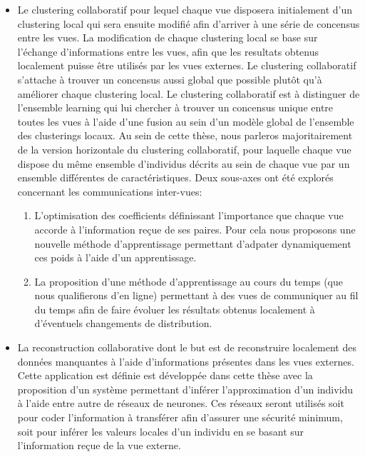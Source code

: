 \begin{itemize}
    \item Le clustering collaboratif pour lequel chaque vue disposera initialement d'un clustering local qui sera ensuite modifi\'{e} afin d'arriver \`{a} une s\'{e}rie de concensus entre les vues. La modification de chaque clustering local se base sur l'\'{e}change d'informations entre les vues, afin que les resultats obtenus localement puisse \^{e}tre utilis\'{e}s par les vues externes. Le clustering collaboratif s'attache \`{a} trouver un concensus aussi global que possible plutôt qu'\`{a} am\'{e}liorer chaque clustering local. Le clustering collaboratif est à distinguer de l'ensemble learning qui lui chercher à trouver un concensus unique entre toutes les vues à l'aide d'une fusion au sein d'un modèle global de l'ensemble des clusterings locaux. Au sein de cette th\`{e}se, nous parleros majoritairement de la version horizontale du clustering collaboratif, pour laquelle chaque vue dispose du m\^{e}me ensemble d'individus d\'{e}crits au sein de chaque vue par un ensemble diff\'{e}rentes de caractéristiques. Deux sous-axes ont été explorés concernant les communications inter-vues:
        \begin{enumerate}
            \item L'optimisation des coefficients définissant l'importance que chaque vue accorde à l'information reçue de ses paires. Pour cela nous proposons une nouvelle méthode d'apprentissage permettant d'adpater dynamiquement ces poids à l'aide d'un apprentissage.
            \item La proposition d'une méthode d'apprentissage au cours du temps (que nous qualifierons d'en ligne) permettant à des vues de communiquer au fil du temps afin de faire évoluer les résultats obtenus localement à d'éventuels changements de distribution.
        \end{enumerate}

    \item La reconstruction collaborative dont le but est de reconstruire localement des données manquantes à l'aide d'informations présentes dans les vues externes. Cette application est définie est développée dans cette thèse avec la proposition d'un système permettant d'inférer l'approximation d'un individu à l'aide entre autre de réseaux de neurones. Ces réseaux seront utilisés soit pour coder l'information à transférer afin d'assurer une sécurité minimum, soit pour inférer les valeurs locales d'un individu en se basant sur l'information reçue de la vue externe.
\end{itemize}


